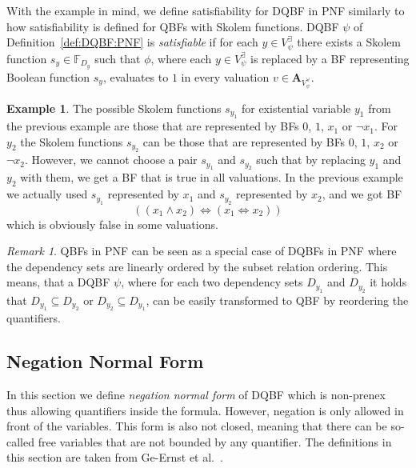 \documentclass[
  digital, %
  color,
  twoside, %
  table,   %
  nolof,     %
  nolot,     %
]{fithesis3}
\theoremstyle{definition}
\newtheorem{example}{Example}
\theoremstyle{remark}
\newtheorem*{remark}{Remark}
\newcommand{\valtns}[1]{\mathbf{A}_{#1}}
\newcommand{\BFuncs}[1]{\mathbb{F}_{#1}}
\newcommand{\evars}[1]{V_{#1}^{\exists}}
\newcommand{\uvars}[1]{V_{#1}^{\forall}}
\newcommand{\lequal}{\Leftrightarrow}
\begin{document}
With the example in mind, we define satisfiability for DQBF in PNF similarly to how satisfiability is defined for QBFs with Skolem functions. DQBF $\psi$ of Definition~\ref{def:DQBF:PNF} is \emph{satisfiable} if for each $y \in \evars{\psi}$ there exists a Skolem function $s_y \in \BFuncs{D_y}$ such that $\phi$, where each $y \in \evars{\psi}$ is replaced by a BF representing Boolean function $s_y$, evaluates to $1$ in every valuation $v \in \valtns{\uvars{\psi}}$.

\begin{example}
The possible Skolem functions $s_{y_1}$ for existential variable $y_1$ from the previous example are those that are represented by BFs $0$, $1$, $x_1$ or $\neg x_1$. For $y_2$ the Skolem functions $s_{y_2}$ can be those that are represented by BFs $0$, $1$, $x_2$ or $\neg x_2$. However, we cannot choose a pair $s_{y_1}$ and $s_{y_2}$ such that by replacing $y_1$ and $y_2$ with them, we get a BF that is true in all valuations. In the previous example we actually used $s_{y_1}$ represented by $x_1$ and $s_{y_2}$ represented by $x_2$, and we got BF
\[((x_1 \land x_2) \lequal (x_1 \lequal x_2))\]
which is obviously false in some valuations.
\end{example}

\begin{remark}
QBFs in PNF can be seen as a special case of DQBFs in PNF where the dependency sets are linearly ordered by the subset relation ordering. This means, that a DQBF $\psi$, where for each two dependency sets $D_{y_1}$ and $D_{y_2}$ it holds that $D_{y_1} \subseteq D_{y_2}$ or $D_{y_2} \subseteq D_{y_1}$, can be easily transformed to QBF by reordering the quantifiers.
\end{remark}

\subsection{Negation Normal Form}
In this section we define \emph{negation normal form} of DQBF which is non-prenex thus allowing quantifiers inside the formula. However, negation is only allowed in front of the variables. %
This form is also not closed, meaning that there can be so-called free variables that are not bounded by any quantifier. The definitions in this section are taken from Ge-Ernst et al.~\cite{HQSquantifierLocalisation}.
\end{document}
